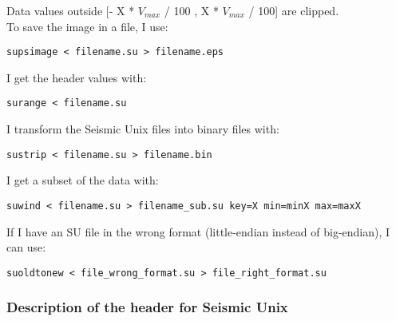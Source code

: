 \documentclass{article}
\begin{document}
Data values outside [- X * $V_{max}$ / 100 , X * $V_{max}$ / 100] are clipped.\\

To save the image in a file, I use:

\begin{verbatim}
supsimage < filename.su > filename.eps
\end{verbatim}

I get the header values with:

\begin{verbatim}
surange < filename.su
\end{verbatim}

I transform the Seismic Unix files into binary files with:

\begin{verbatim}
sustrip < filename.su > filename.bin
\end{verbatim}

I get a subset of the data with:

\begin{verbatim}
suwind < filename.su > filename_sub.su key=X min=minX max=maxX
\end{verbatim}

If I have an SU file in the wrong format (little-endian instead of big-endian), I can use:

\begin{verbatim}
suoldtonew < file_wrong_format.su > file_right_format.su
\end{verbatim}

\subsubsection{Description of the header for Seismic Unix}
\end{document}
